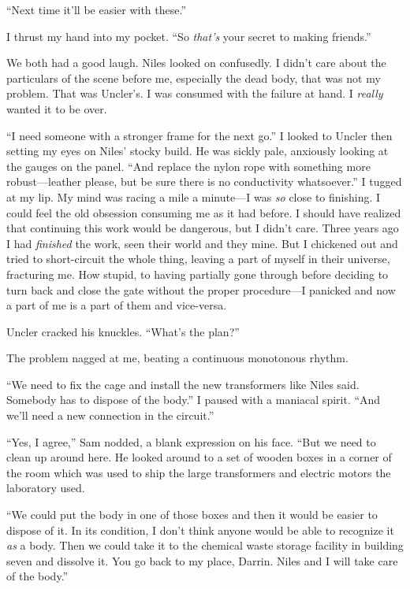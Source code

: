 ``Next time it'll be easier with these.''

I thrust my hand into my pocket. ``So \emph{that's} your secret to
making friends.''

We both had a good laugh. Niles looked on confusedly. I didn't care
about the particulars of the scene before me, especially the dead body,
that was not my problem. That was Uncler's. I was consumed with the
failure at hand. I \emph{really} wanted it to be over.

``I need someone with a stronger frame for the next go.'' I looked to
Uncler then setting my eyes on Niles' stocky build. He was sickly pale,
anxiously looking at the gauges on the panel. ``And replace the nylon
rope with something more robust---leather please, but be sure there is
no conductivity whatsoever.'' I tugged at my lip. My mind was racing a
mile a minute---I was \emph{so} close to finishing. I could feel the old
obsession consuming me as it had before. I should have realized that
continuing this work would be dangerous, but I didn't care. Three years
ago I had \emph{finished} the work, seen their world and they mine. But
I chickened out and tried to short-circuit the whole thing, leaving a
part of myself in their universe, fracturing me. How stupid, to having
partially gone through before deciding to turn back and close the gate
without the proper procedure---I panicked and now a part of me is a part
of them and vice-versa.

Uncler cracked his knuckles. ``What's the plan?''

The problem nagged at me, beating a continuous monotonous rhythm.

``We need to fix the cage and install the new transformers like Niles
said. Somebody has to dispose of the body.'' I paused with a maniacal
spirit. ``And we'll need a new connection in the circuit.''

``Yes, I agree,'' Sam nodded, a blank expression on his face. ``But we
need to clean up around here. He looked around to a set of wooden boxes
in a corner of the room which was used to ship the large transformers
and electric motors the laboratory used.

``We could put the body in one of those boxes and then it would be
easier to dispose of it. In its condition, I don't think anyone would be
able to recognize it \emph{as} a body. Then we could take it to the
chemical waste storage facility in building seven and dissolve it. You
go back to my place, Darrin. Niles and I will take care of the body.''

